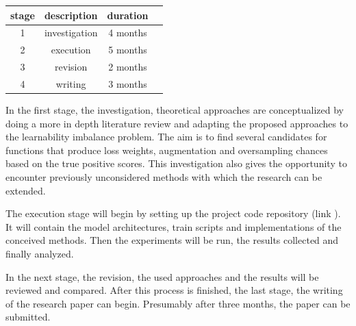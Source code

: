 \documentclass[journal]{IEEEtran}
\begin{document}
\begin{center}

        \begin{tabular}{ |c|c|c|c| } 
                \hline
                stage & description & duration \\
                \hline
                1 & investigation & 4 months \\ 
                2 & execution & 5 months \\ 
                3 & revision & 2 months \\ 
                4 & writing & 3 months \\
                \hline

        \end{tabular}
\end{center}
        
In the first stage, the investigation, theoretical approaches are conceptualized by doing a more in depth literature review and adapting the proposed approaches to the learnability imbalance problem. 
The aim is to find several candidates for functions that produce loss weights, augmentation and oversampling chances based on the true positive scores.
This investigation also gives the opportunity to encounter previously unconsidered methods with which the research can be extended.

The execution stage will begin by setting up the project code repository (link \cite{githubResearchProposal}). 
It will contain the model architectures, train scripts and implementations of the conceived methods.
Then the experiments will be run, the results collected and finally analyzed. 

In the next stage, the revision, the used approaches and the results will be reviewed and compared. 
After this process is finished, the last stage, the writing of the research paper can begin. 
Presumably after three months, the paper can be submitted.  

\printbibliography
\end{document}

